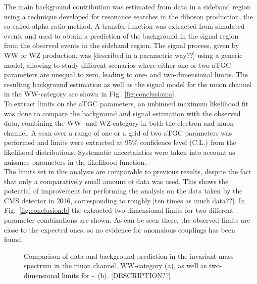 The main background contribution was estimated from data in a sideband region using a technique developed for resonance searches in the diboson production, the so-called alpha-ratio-method. A transfer function was extracted from simulated events and used to obtain a prediction of the background in the signal region from the observed events in the sideband region. The signal process, given by WW or WZ production, was [described in a parametric way??] using a generic model, allowing to study different scenarios where either one or two aTGC parameters are unequal to zero, leading to one- and two-dimensional limits. The resulting background estimation as well as the signal model for the muon channel in the WW-category are shown in Fig.~\ref{fig:conclusion:a}.\\

To extract limits on the aTGC parameters, an unbinned maximum likelihood fit was done to compare the background and signal estimation with the observed data, combining the WW- and WZ-category in both the electron and muon channel. A scan over a range of one or a grid of two aTGC parameters was performed and limits were extracted at 95\% confidence level (C.L.) from the likelihood distributions. Systematic uncertainties were taken into account as nuisance parameters in the likelihood function.\\

The limits set in this analysis are comparable to previous results, despite the fact that only a comparatively small amount of data was used. This shows the potential of improvement for performing the analysis on the data taken by the CMS detector in 2016, corresponding to roughly [ten times as much data??]. In Fig.~\ref{fig:conclusion:b} the extracted two-dimensional limits for two different parameter combinations are shown. As can be seen there, the observed limits are close to the expected ones, so no evidence for anomalous couplings has been found.

\begin{figure}
    \centering
    \resizebox{\columnwidth}{!}
    {%
    \caption[Comparison of data and background prediction as well as two-dimensional limits for \Tccw -\Tcb]{Comparison of data and background prediction in the invariant mass spectrum in the muon channel, WW-category (a), as well as two-dimensional limits for \Tccw -\Tcb \ (b). [DESCRIPTION??]}
    \label{fig:conclusion}
    }
\end{figure}